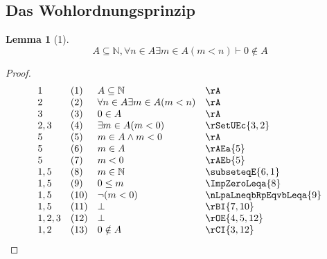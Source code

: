 \documentclass{book}
\theoremstyle{plain}
\newtheorem*{lemma}{Lemma}
\theoremstyle{remark}
\theoremstyle{definition}
\begin{document}
\subsection{Das Wohlordnungsprinzip}
\begin{lemma}[1]
\[A\subseteq\mathbb{N},\forall n\in A\exists m\in A(m<n)\vdash 0\notin A\]
\end{lemma}
\begin{proof}
	\[
	\begin{array}{llll}
        1  & (1) & A\subseteq\mathbb{N} & \rA \\
	2  & (2) & \forall n\in A\exists m\in A(m<n) & \rA \\
        3  & (3) & 0\in A & \rA \\
        2,3& (4) & \exists m\in A(m<0) & \rSetUEc{3,2} \\
        5  & (5) & m\in A\land m<0 & \rA \\
        5  & (6) & m\in A          & \rAEa{5} \\
        5  & (7) & m<0             & \rAEb{5} \\
        1,5& (8) & m\in\mathbb{N}  & \subseteqE{6,1} \\
        1,5& (9) & 0\leq m & \ImpZeroLeqa{8} \\
        1,5& (10) & \neg(m<0) & \nLpaLneqbRpEqvbLeqa{9} \\
        1,5& (11) & \bot & \rBI{7,10} \\
        1,2,3& (12) & \bot & \rOE{4,5,12} \\
        1,2& (13) & 0\notin A & \rCI{3,12} \\
	\end{array}
	\]
\end{proof}
\end{document}
